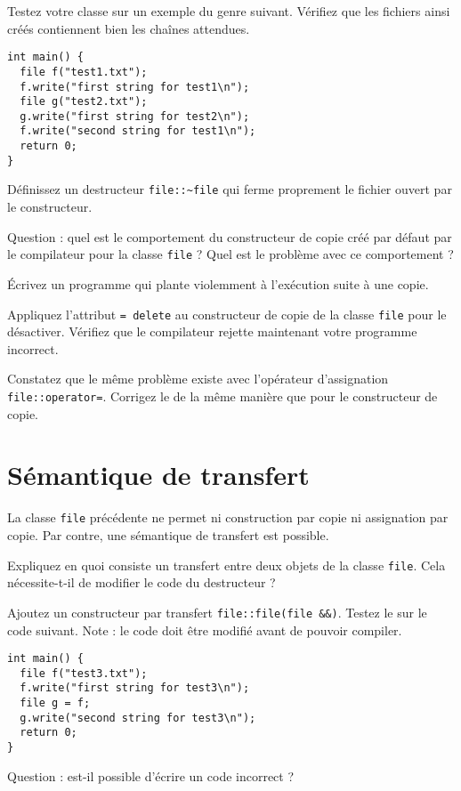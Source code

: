 \documentclass[a4paper]{article}
\begin{document}
Testez votre classe sur un exemple du genre suivant. Vérifiez que les
fichiers ainsi créés contiennent bien les chaînes attendues.
\begin{lstlisting}
int main() {
  file f("test1.txt");
  f.write("first string for test1\n");
  file g("test2.txt");
  g.write("first string for test2\n");
  f.write("second string for test1\n");
  return 0;
}
\end{lstlisting}

Définissez un destructeur \lstinline|file::~file| qui ferme proprement le
fichier ouvert par le constructeur.

Question : quel est le comportement du constructeur de copie créé par
défaut par le compilateur pour la classe \lstinline|file| ? Quel est le
problème avec ce comportement ?

Écrivez un programme qui plante violemment à l'exécution suite à une copie.

Appliquez l'attribut \lstinline|= delete| au constructeur de copie de la
classe \lstinline|file| pour le désactiver. Vérifiez que le compilateur
rejette maintenant votre programme incorrect.

Constatez que le même problème existe avec l'opérateur d'assignation
\lstinline|file::operator=|. Corrigez le de la même manière que pour le
constructeur de copie.

\section{Sémantique de transfert}

La classe \lstinline|file| précédente ne permet ni construction par copie
ni assignation par copie. Par contre, une sémantique de transfert est
possible.

Expliquez en quoi consiste un transfert entre deux objets de la classe
\lstinline|file|. Cela nécessite-t-il de modifier le code du destructeur ?

Ajoutez un constructeur par transfert \lstinline|file::file(file &&)|.
Testez le sur le code suivant. Note : le code doit être modifié avant de
pouvoir compiler.
\begin{lstlisting}
int main() {
  file f("test3.txt");
  f.write("first string for test3\n");
  file g = f;
  g.write("second string for test3\n");
  return 0;
}
\end{lstlisting}

Question : est-il possible d'écrire un code incorrect ?
\end{document}
